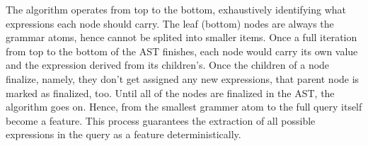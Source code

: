 The algorithm operates from top to the bottom, exhaustively identifying what expressions each node should carry. The leaf (bottom) nodes are always the grammar atoms, hence cannot be splited into smaller items. Once a full iteration from top to the bottom of the AST finishes, each node would carry its own value and the expression derived from its children's. Once the children of a node finalize, namely, they don't get assigned any new expressions, that parent node is marked as finalized, too. Until all of the nodes are finalized in the AST, the algorithm goes on. Hence, from the smallest grammer atom to the full query itself become a feature. This process guarantees the extraction of all possible expressions in the query as a feature deterministically.


